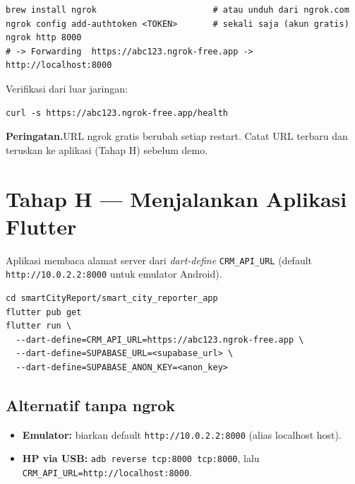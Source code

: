 \documentclass[11pt,a4paper]{article}
\newcommand{\code}[1]{\texttt{\small #1}}
\newcommand{\stage}[2]{%
  \par\medskip\noindent\colorbox{stagebg}{\parbox{\dimexpr\linewidth-2\fboxsep}{%
  \textbf{\color{accent}#1}\;\;#2}}\par\smallskip}
\begin{document}
\begin{lstlisting}
brew install ngrok                       # atau unduh dari ngrok.com
ngrok config add-authtoken <TOKEN>       # sekali saja (akun gratis)
ngrok http 8000
# -> Forwarding  https://abc123.ngrok-free.app -> http://localhost:8000
\end{lstlisting}

Verifikasi dari luar jaringan:
\begin{lstlisting}
curl -s https://abc123.ngrok-free.app/health
\end{lstlisting}

\stage{Peringatan.}{URL ngrok gratis berubah setiap restart. Catat URL terbaru dan teruskan ke aplikasi (Tahap H) sebelum demo.}

\section{Tahap H — Menjalankan Aplikasi Flutter}
Aplikasi membaca alamat server dari \emph{dart-define} \code{CRM\_API\_URL}
(default \code{http://10.0.2.2:8000} untuk emulator Android).

\begin{lstlisting}
cd smartCityReport/smart_city_reporter_app
flutter pub get
flutter run \
  --dart-define=CRM_API_URL=https://abc123.ngrok-free.app \
  --dart-define=SUPABASE_URL=<supabase_url> \
  --dart-define=SUPABASE_ANON_KEY=<anon_key>
\end{lstlisting}

\subsection{Alternatif tanpa ngrok}
\begin{itemize}[leftmargin=1.4em,itemsep=2pt]
  \item \textbf{Emulator:} biarkan default \code{http://10.0.2.2:8000} (alias localhost host).
  \item \textbf{HP via USB:} \code{adb reverse tcp:8000 tcp:8000}, lalu
        \code{CRM\_API\_URL=http://localhost:8000}.
\end{itemize}

\end{document}
